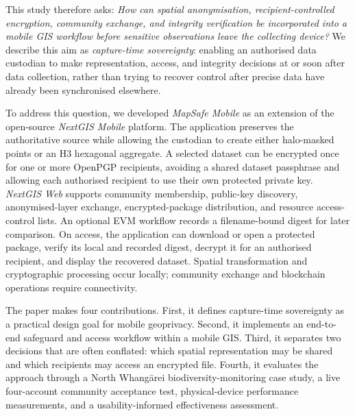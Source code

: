 \documentclass[]{interact}
\begin{document}
This study therefore asks: \emph{How can spatial anonymisation, recipient-controlled encryption, community exchange, and integrity verification be incorporated into a mobile GIS workflow before sensitive observations leave the collecting device?} We describe this aim as \emph{capture-time sovereignty}: enabling an authorised data custodian to make representation, access, and integrity decisions at or soon after data collection, rather than trying to recover control after precise data have already been synchronised elsewhere.

To address this question, we developed \textit{MapSafe Mobile} as an extension of the open-source \textit{NextGIS Mobile} platform. The application preserves the authoritative source while allowing the custodian to create either halo-masked points or an H3 hexagonal aggregate. A selected dataset can be encrypted once for one or more OpenPGP recipients, avoiding a shared dataset passphrase and allowing each authorised recipient to use their own protected private key. \textit{NextGIS Web} supports community membership, public-key discovery, anonymised-layer exchange, encrypted-package distribution, and resource access-control lists. An optional EVM workflow records a filename-bound digest for later comparison. On access, the application can download or open a protected package, verify its local and recorded digest, decrypt it for an authorised recipient, and display the recovered dataset. Spatial transformation and cryptographic processing occur locally; community exchange and blockchain operations require connectivity.

The paper makes four contributions. First, it defines capture-time sovereignty as a practical design goal for mobile geoprivacy. Second, it implements an end-to-end safeguard and access workflow within a mobile GIS. Third, it separates two decisions that are often conflated: which spatial representation may be shared and which recipients may access an encrypted file. Fourth, it evaluates the approach through a North Whang\={a}rei biodiversity-monitoring case study, a live four-account community acceptance test, physical-device performance measurements, and a usability-informed effectiveness assessment.

\end{document}
